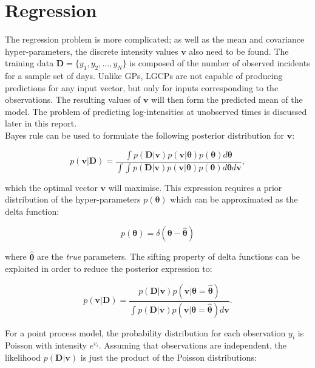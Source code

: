 \documentclass[a4paper,11pt]{report}
\begin{document}
\section{Regression}

The regression problem is more complicated; as well as the mean and covariance hyper-parameters, the discrete intensity values \(\mathbf{v}\) also need to be found. The training data \(\mathbf{D} = \{y_1,y_2, ..., y_N\}\) is composed of the number of observed incidents for a sample set of days. Unlike GPs, LGCPs are not capable of producing predictions for any input vector, but only for inputs corresponding to the observations. The resulting values of \(\mathbf{v}\) will then form the predicted mean of the model. The problem of predicting log-intensities at unobserved times is discussed later in this report.\\

Bayes rule can be used to formulate the following posterior distribution for \(\mathbf{v}\):

\begin{equation} \label{eq:LCGPposterior}
p(\mathbf{v | D}) = \frac{\int{p(\mathbf{D|v})p(\mathbf{v}|\boldsymbol{\theta})p(\boldsymbol{\theta}) d\boldsymbol{\theta}}}{\int{\int{p(\mathbf{D|v})p(\mathbf{v}|\boldsymbol{\theta})p(\boldsymbol{\theta}) d\boldsymbol{\theta} d\mathbf{v}}}},
\end{equation}

which the optimal vector \(\mathbf{v}\) will maximise. This expression requires a prior distribution of the hyper-parameters \(p(\boldsymbol{\theta})\) which can be approximated as the delta function:

\begin{equation}
p(\boldsymbol{\theta}) = \delta(\boldsymbol{\theta} - \hat{\boldsymbol{\theta}})
\end{equation}

where \(\hat{\boldsymbol{\theta}}\) are the \textit{true} parameters. The sifting property of delta functions can be exploited in order to reduce the posterior expression to:

\begin{equation} \label{eq:LCGPposterior2}
p(\mathbf{v | D}) = \frac{p(\mathbf{D|v})p(\mathbf{v}|\boldsymbol{\theta}=\hat{\boldsymbol{\theta}}) }{\int{p(\mathbf{D|v})p(\mathbf{v}|\boldsymbol{\theta}=\hat{\boldsymbol{\theta}}) d\mathbf{v}}}.
\end{equation}

For a point process model, the probability distribution for each observation \(y_i\) is Poisson with intensity \(e^{v_i}\). Assuming that observations are independent, the likelihood \(p(\mathbf{D|v})\) is just the product of the Poisson distributions:
\end{document}
